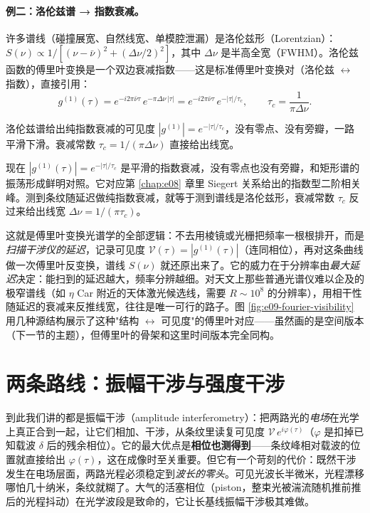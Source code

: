 \paragraph{例二：洛伦兹谱 → 指数衰减。}许多谱线（碰撞展宽、自然线宽、单模腔泄漏）是洛伦兹形（Lorentzian）：\(S(\nu)\propto 1/[(\nu-\bar\nu)^2+(\Delta\nu/2)^2]\)，其中 \(\Delta\nu\) 是半高全宽（FWHM）。洛伦兹函数的傅里叶变换是一个双边衰减指数——这是标准傅里叶变换对（洛伦兹 \(\leftrightarrow\) 指数），直接引用：
\begin{equation}
  g^{(1)}(\tau)=e^{-i2\pi\bar\nu\tau}\,e^{-\pi\Delta\nu\,|\tau|}
  =e^{-i2\pi\bar\nu\tau}\,e^{-|\tau|/\tau_c},
  \qquad
  \tau_c=\frac{1}{\pi\Delta\nu} .
  \label{eq:e09-lorentz-exp}
\end{equation}
\begin{formulaexplain}
洛伦兹谱给出纯指数衰减的可见度 \(|g^{(1)}|=e^{-|\tau|/\tau_c}\)，没有零点、没有旁瓣，一路平滑下滑。衰减常数 \(\tau_c=1/(\pi\Delta\nu)\) 直接给出线宽。
\end{formulaexplain}
现在 \(|g^{(1)}(\tau)|=e^{-|\tau|/\tau_c}\) 是平滑的指数衰减，没有零点也没有旁瓣，和矩形谱的振荡形成鲜明对照。它对应第 \ref{chap:e08} 章里 Siegert 关系给出的指数型二阶相关峰。测到条纹随延迟做纯指数衰减，就等于测到谱线是洛伦兹形，衰减常数 \(\tau_c\) 反过来给出线宽 \(\Delta\nu=1/(\pi\tau_c)\)。

这就是傅里叶变换光谱学的全部逻辑：不去用棱镜或光栅把频率一根根排开，而是\emph{扫描干涉仪的延迟}，记录可见度 \(\mathcal V(\tau)=|g^{(1)}(\tau)|\)（连同相位），再对这条曲线做一次傅里叶反变换，谱线 \(S(\nu)\) 就还原出来了。它的威力在于分辨率由\emph{最大延迟}决定：能扫到的延迟越大，频率分辨越细。对天文上那些普通光谱仪难以企及的极窄谱线（如 \(\eta\) Car 附近的天体激光候选线，需要 \(R\sim10^8\) 的分辨率），用相干性随延迟的衰减来反推线宽，往往是唯一可行的路子。图 \ref{fig:e09-fourier-visibility} 用几种源结构展示了这种"结构 \(\leftrightarrow\) 可见度"的傅里叶对应——虽然画的是空间版本（下一节的主题），但傅里叶的骨架和这里时间版本完全同构。

\section{两条路线：振幅干涉与强度干涉}
\label{sec:e09-two-routes}

到此我们讲的都是振幅干涉（amplitude interferometry）：把两路光的\emph{电场}在光学上真正合到一起，让它们相加、干涉，从条纹里读复可见度 \(\mathcal V\,e^{i\varphi(\tau)}\)（\(\varphi\) 是扣掉已知载波 \(\delta\) 后的残余相位）。它的最大优点是\textbf{相位也测得到}——条纹峰相对载波的位置就直接给出 \(\varphi(\tau)\)，这在成像时至关重要。但它有一个苛刻的代价：既然干涉发生在电场层面，两路光程必须稳定到\emph{波长的零头}。可见光波长半微米，光程漂移哪怕几十纳米，条纹就糊了。大气的活塞相位（piston，整束光被湍流随机推前推后的光程抖动）在光学波段是致命的，它让长基线振幅干涉极其难做。


